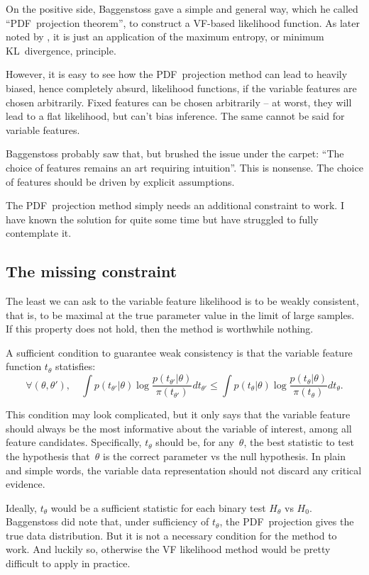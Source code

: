 \documentclass[english]{scrartcl}
\begin{document}
On the positive side, Baggenstoss gave a simple and general way, which he called ``PDF~projection theorem'', to construct a VF-based likelihood function. As later noted by \cite{Minka-04}, it is just an application of the maximum entropy, or minimum KL~divergence, principle.

However, it is easy to see how the PDF~projection method can lead to heavily biased, hence completely absurd, likelihood functions, if the variable features are chosen arbitrarily. Fixed features can be chosen arbitrarily -- at worst, they will lead to a flat likelihood, but can't bias inference. The same cannot be said for variable features. 

Baggenstoss probably saw that, but brushed the issue under the carpet: ``The choice of features remains an art requiring intuition''. This is nonsense. The choice of features should be driven by explicit assumptions.

The PDF~projection method simply needs an additional constraint to work. I have known the solution for quite some time but have struggled to fully contemplate it.

\subsection{The missing constraint}

The least we can ask to the variable feature likelihood is to be weakly consistent, that is, to be maximal at the true parameter value in the limit of large samples. If this property does not hold, then the method is worthwhile nothing.

A sufficient condition to guarantee weak consistency is that the variable feature function $t_\theta$ statisfies:
$$
\forall (\theta, \theta'),
\quad
\int p(t_{\theta'}|\theta) \log \frac{p(t_{\theta'}|\theta)}{\pi(t_{\theta'})} dt_{\theta'}
  \leq
\int p(t_{\theta}|\theta) \log \frac{p(t_{\theta}|\theta)}{\pi(t_{\theta})} dt_{\theta}
.
$$

This condition may look complicated, but it only says that the variable feature should always be the most informative about the variable of interest, among all feature candidates. Specifically, $t_\theta$ should be, for any~$\theta$, the best statistic to test the hypothesis that~$\theta$ is the correct parameter vs the null hypothesis. In plain and simple words, the variable data representation should not discard any critical evidence.

Ideally, $t_\theta$ would be a sufficient statistic for each binary test $H_\theta$ vs $H_0$. Baggenstoss did note that, under sufficiency of $t_\theta$, the PDF~projection gives the true data distribution. But it is not a necessary condition for the method to work. And luckily so, otherwise the VF likelihood method would be pretty difficult to apply in practice.
\end{document}
